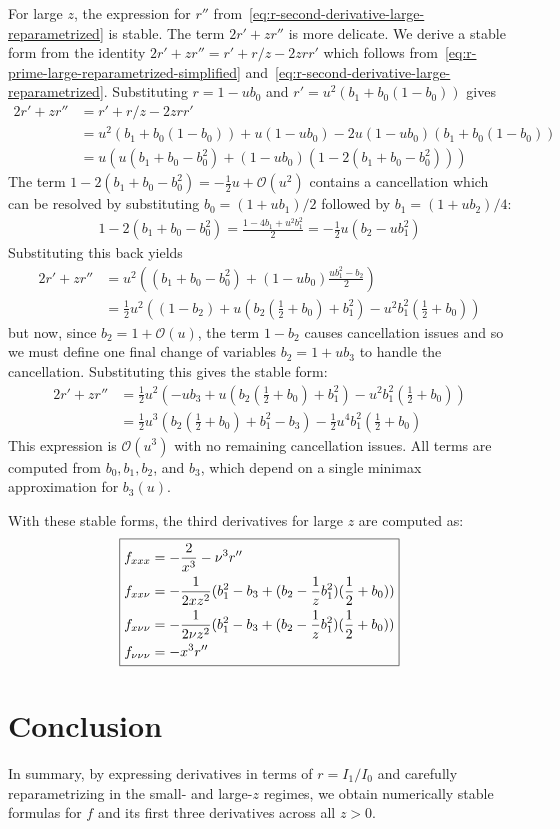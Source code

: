\documentclass{article}
\begin{document}
For large $z$, the expression for $r''$ from~\eqref{eq:r-second-derivative-large-reparametrized} is stable.
The term $2r'+zr''$ is more delicate.
We derive a stable form from the identity $2r' + zr'' = r' + r/z - 2zrr'$ which follows from~\eqref{eq:r-prime-large-reparametrized-simplified} and~\eqref{eq:r-second-derivative-large-reparametrized}.
Substituting $r=1-ub_0$ and $r'=u^2(b_1+b_0(1-b_0))$ gives
%
\begin{align}
  2r' + zr'' &= r' + r/z - 2zrr' \\
            &= u^2 (b_1+b_0(1-b_0)) + u(1-ub_0) - 2u(1-ub_0)(b_1+b_0(1-b_0)) \\
             &= u ( u(b_1+b_0-b_0^2) + (1-ub_0)(1 - 2(b_1+b_0-b_0^2)) )
\end{align}
%
The term $1-2(b_1+b_0-b_0^2) = -\frac{1}{2}u + \mathcal{O}(u^2)$ contains a cancellation which can be resolved by substituting $b_0=(1+ub_1)/2$ followed by $b_1=(1+ub_2)/4$:
%
\begin{align}
  1-2(b_1+b_0-b_0^2) = \frac{1-4b_1+u^2b_1^2}{2} = -\frac{1}{2}u(b_2 - u b_1^2)
\end{align}
%
Substituting this back yields
%
\begin{align}
  2r' + zr'' &= u^2 ( (b_1+b_0-b_0^2) + (1-ub_0)\frac{u b_1^2 - b_2}{2} ) \\
  &= \frac{1}{2} u^2 ( (1-b_2) + u (b_2 (\frac{1}{2}+b_0 ) + b_1^2 ) - u^2 b_1^2 (\frac{1}{2} + b_0 ) )
\end{align}
%
but now, since $b_2 = 1 + \mathcal{O}(u)$, the term $1-b_2$ causes cancellation issues and so we must define one final change of variables $b_2 = 1 + u b_3$ to handle the cancellation.
Substituting this gives the stable form:
%
\begin{align}
  2r' + zr'' &= \frac{1}{2} u^2 ( -u b_3 + u (b_2 (\frac{1}{2}+b_0 ) + b_1^2 ) - u^2 b_1^2 (\frac{1}{2} + b_0 ) ) \\
             &= \frac{1}{2} u^3 ( b_2 (\frac{1}{2}+b_0 ) + b_1^2 - b_3) - \frac{1}{2} u^4 b_1^2 (\frac{1}{2} + b_0) \label{eq:2rprime-zrsecondprime-large-z}
\end{align}
%
This expression is $\mathcal{O}(u^3)$ with no remaining cancellation issues.
All terms are computed from $b_0, b_1, b_2$, and $b_3$, which depend on a single minimax approximation for $b_3(u)$.

With these stable forms, the third derivatives for large $z$ are computed as:
\begin{align}\label{eq:third-derivatives-large-z}
  \boxed{%
    \begin{aligned}
      f_{xxx}       & = -\frac{2}{x^3} - \nu^3 r'' \\
      f_{xx\nu}     & = -\frac{1}{2 x z^2}   ( b_1^2 - b_3 + (b_2  - \frac{1}{z} b_1^2) (\frac{1}{2} + b_0))         \\
      f_{x\nu\nu}   & = -\frac{1}{2 \nu z^2} ( b_1^2 - b_3 + (b_2  - \frac{1}{z} b_1^2) (\frac{1}{2} + b_0))           \\
      f_{\nu\nu\nu} & = -x^3 r''
    \end{aligned}}
\end{align}

\section{Conclusion}

In summary, by expressing derivatives in terms of $r=I_1/I_0$ and carefully reparametrizing in the small- and large-$z$ regimes, we obtain numerically stable formulas for $f$ and its first three derivatives across all $z>0$.
\end{document}
